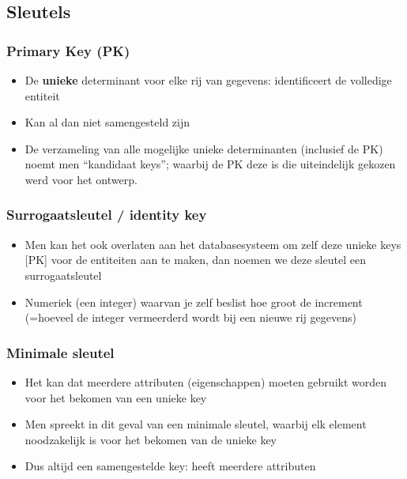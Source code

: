 \documentclass{article}
\newcommand{\bold}[1]{\textbf{#1}}
\begin{document}
\subsection{Sleutels}

\subsubsection{Primary Key (PK)}

\begin{itemize}
    \item De \bold{unieke} determinant voor elke rij van gegevens: identificeert de volledige entiteit
    \item Kan al dan niet samengesteld zijn
    \item De verzameling van alle mogelijke unieke determinanten (inclusief de PK) noemt men “kandidaat keys”; waarbij de PK deze is die uiteindelijk gekozen werd voor het ontwerp.    
\end{itemize}

\subsubsection{Surrogaatsleutel / identity key}
\begin{itemize}
    \item Men kan het ook overlaten aan het databasesysteem om zelf deze unieke keys [PK] voor de entiteiten aan te maken, dan noemen we deze sleutel een surrogaatsleutel
    \item Numeriek (een integer) waarvan je zelf beslist hoe groot de increment (=hoeveel de integer vermeerderd wordt bij een nieuwe rij gegevens)
\end{itemize}

\subsubsection{Minimale sleutel}
\begin{itemize}
    \item Het kan dat meerdere attributen (eigenschappen) moeten gebruikt worden voor het bekomen van een unieke key
    \item Men spreekt in dit geval van een minimale sleutel, waarbij elk element noodzakelijk is voor het bekomen van de unieke key
    \item Dus altijd een samengestelde key: heeft meerdere attributen
\end{itemize}
\end{document}
